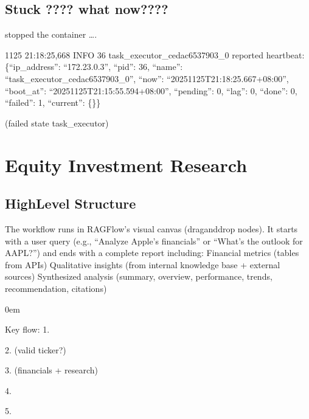 \documentclass[letterpaper,10pt,english]{sphinxmanual}
\begin{document}
\section{Stuck ???? what now????}
\label{\detokenize{graphrag:stuck-what-now}}
\sphinxAtStartPar
stopped the container ….

\sphinxhyphen{}11\sphinxhyphen{}25 21:18:25,668 INFO     36 task\_executor\_cedac6537903\_0 reported heartbeat: \{“ip\_address”: “172.23.0.3”, “pid”: 36, “name”: “task\_executor\_cedac6537903\_0”, “now”: “2025\sphinxhyphen{}11\sphinxhyphen{}25T21:18:25.667+08:00”, “boot\_at”: “2025\sphinxhyphen{}11\sphinxhyphen{}25T21:15:55.594+08:00”, “pending”: 0, “lag”: 0, “done”: 0, “failed”: 1, “current”: \{\}\}

\sphinxAtStartPar
(failed state task\_executor)

\sphinxstepscope


\chapter{Equity Investment Research}
\label{\detokenize{agentic-example:equity-investment-research}}\label{\detokenize{agentic-example::doc}}

\section{High\sphinxhyphen{}Level Structure}
\label{\detokenize{agentic-example:high-level-structure}}
\sphinxAtStartPar
The workflow runs in RAGFlow’s visual canvas (drag\sphinxhyphen{}and\sphinxhyphen{}drop nodes). It
starts with a user query (e.g., “Analyze Apple’s financials” or “What’s
the outlook for AAPL?”) and ends with a complete report including: \sphinxhyphen{}
Financial metrics (tables from APIs) \sphinxhyphen{} Qualitative insights (from
internal knowledge base + external sources) \sphinxhyphen{} Synthesized analysis
(summary, overview, performance, trends, recommendation, citations)

\begin{DUlineblock}{0em}
\item[] Key flow: 1. 
\item[] 2.  (valid ticker?)
\item[] 3.  (financials + research)
\item[] 4. 
\item[] 5. 
\end{DUlineblock}
\end{document}
